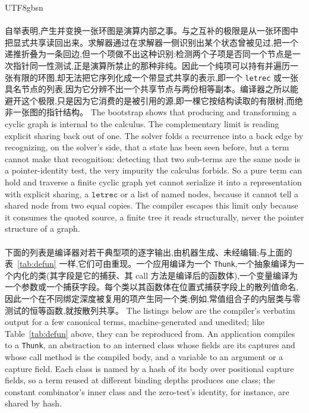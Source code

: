 \begin{CJK*}{UTF8}{gbsn}
  \paragraph{}
  \ifTablambdaChinese
  自举表明,产生并变换一张环图是演算内部之事。与之互补的极限是从一张环图中把显式共享读回出来。求解器通过在求解器一侧识别出某个状态曾被见过,把一个递推折叠为一条回边,但一个项做不出这种识别:检测两个子项是否同一个节点是一次指针同一性测试,正是演算所禁止的那种非纯。因此一个纯项可以持有并遍历一张有限的环图,却无法把它序列化成一个带显式共享的表示,即一个 \texttt{letrec} 或一张具名节点的列表,因为它分辨不出一个共享节点与两份相等副本。编译器之所以能避开这个极限,只是因为它消费的是被引用的源,即一棵它按结构读取的有限树,而绝非一张图的指针结构。
  \else
  The bootstrap shows that producing and transforming a cyclic graph is internal to the calculus. The complementary limit is reading explicit sharing back out of one. The solver folds a recurrence into a back edge by recognizing, on the solver's side, that a state has been seen before, but a term cannot make that recognition: detecting that two sub-terms are the same node is a pointer-identity test, the very impurity the calculus forbids. So a pure term can hold and traverse a finite cyclic graph yet cannot serialize it into a representation with explicit sharing, a $\mathtt{letrec}$ or a list of named nodes, because it cannot tell a shared node from two equal copies. The compiler escapes this limit only because it consumes the quoted source, a finite tree it reads structurally, never the pointer structure of a graph.
  \fi

  \paragraph{}\label{app:compiler-examples}
  \ifTablambdaChinese
  下面的列表是编译器对若干典型项的逐字输出,由机器生成、未经编辑;与上面的表~\ref{tab:defun} 一样,它们可由重现。一个应用编译为一个 \texttt{Thunk},一个抽象编译为一个内化的类(其字段是它的捕获、其 call 方法是编译后的函数体),一个变量编译为一个参数或一个捕获字段。每个类以其函数体在位置式捕获字段上的散列值命名,因此一个在不同绑定深度被复用的项产生同一个类;例如,常值组合子的内层类与零测试的恒等函数,就按散列共享。
  \else
  The listings below are the compiler's verbatim output for a few canonical terms, machine-generated and unedited; like Table~\ref{tab:defun} above, they can be reproduced from. An application compiles to a \texttt{Thunk}, an abstraction to an interned class whose fields are its captures and whose call method is the compiled body, and a variable to an argument or a capture field. Each class is named by a hash of its body over positional capture fields, so a term reused at different binding depths produces one class; the constant combinator's inner class and the zero-test's identity, for instance, are shared by hash.
  \fi


\end{CJK*}
